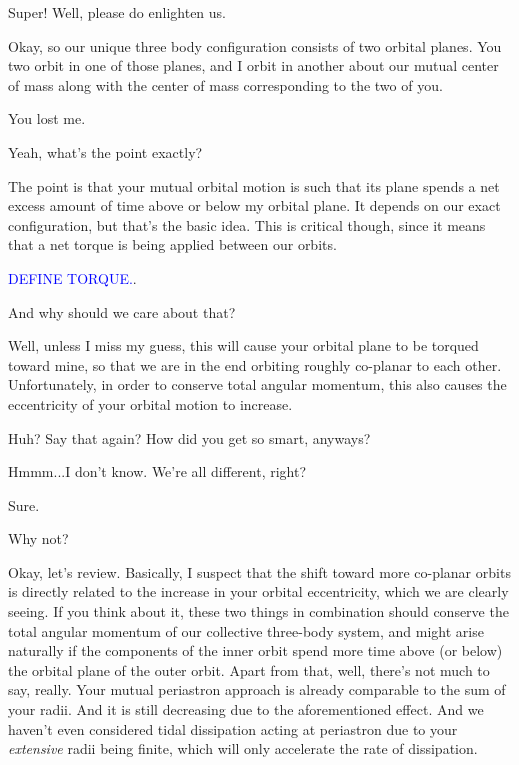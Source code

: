 \documentclass[main.tex]{subfiles}
\begin{document}
\par \Taygete  Super!  Well, please do enlighten us.

\par \Celaeno  Okay, so our unique three body configuration consists of two orbital planes.  You two orbit in one of those planes, and I orbit in another about our mutual center of mass along with the center of mass corresponding to the two of you.

\par \Alcyone  You lost me.

\par \Taygete Yeah, what's the point exactly?

\par \Celaeno The point is that your mutual orbital motion is such that its plane spends a net excess amount of time above or below my orbital plane.  It depends on our exact configuration, but that's the basic idea.  This is critical though, since it means that a net torque is being applied between our orbits.

\begin{tcolorbox}[sharp corners, colback=blue!30, colframe=blue!80!blue, title=Torque]
\par \textcolor{blue}{DEFINE TORQUE.}.  
\end{tcolorbox}

\par \Alcyone And why should we care about that?

\par \Celaeno Well, unless I miss my guess, this will cause your orbital plane to be torqued toward mine, so that we are in the end orbiting roughly co-planar to each other.  Unfortunately, in order to conserve total angular momentum, this also causes the eccentricity of your orbital motion to increase.  

\par \Taygete  Huh?  Say that again?  How did you get so smart, anyways?

\par \Celaeno Hmmm...I don't know.  We're all different, right? 

\par \Alcyone Sure.

\par \Taygete Why not?

\par \Celaeno Okay, let's review.  Basically, I suspect that the shift toward more co-planar orbits is directly related to the increase in your orbital eccentricity, which we are clearly seeing.  If you think about it, these two things in combination should conserve the total angular momentum of our collective three-body system, and might arise naturally if the components of the inner orbit spend more time above (or below) the orbital plane of the outer orbit.  Apart from that, well, there's not much to say, really.  Your mutual periastron approach is already comparable to the sum of your radii.  And it is still decreasing due to the aforementioned effect.  And we haven't even considered tidal dissipation acting at periastron due to your \textit{extensive} radii being finite, which will only accelerate the rate of dissipation.
\end{document}
